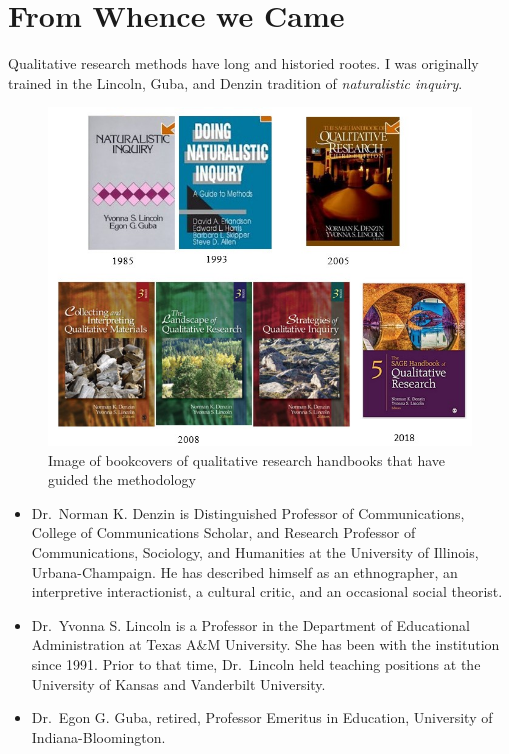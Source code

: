 \documentclass[
  english,
]{book}
\providecommand{\tightlist}{%
  \setlength{\itemsep}{0pt}\setlength{\parskip}{0pt}}
\begin{document}
\hypertarget{from-whence-we-came}{%
\section{From Whence we Came}\label{from-whence-we-came}}

Qualitative research methods have long and historied rootes. I was originally trained in the Lincoln, Guba, and Denzin tradition of \emph{naturalistic inquiry}.

\begin{figure}
\centering
\includegraphics{images/Qualitative/handbooks.jpg}
\caption{Image of bookcovers of qualitative research handbooks that have guided the methodology}
\end{figure}

\begin{itemize}
\tightlist
\item
  Dr.~Norman K. Denzin is Distinguished Professor of Communications, College of Communications Scholar, and Research Professor of Communications, Sociology, and Humanities at the University of Illinois, Urbana-Champaign. He has described himself as an ethnographer, an interpretive interactionist, a cultural critic, and an occasional social theorist.
\item
  Dr.~Yvonna S. Lincoln is a Professor in the Department of Educational Administration at Texas A\&M University. She has been with the institution since 1991. Prior to that time, Dr.~Lincoln held teaching positions at the University of Kansas and Vanderbilt University.
\item
  Dr.~Egon G. Guba, retired, Professor Emeritus in Education, University of Indiana-Bloomington.
\end{itemize}
\end{document}
